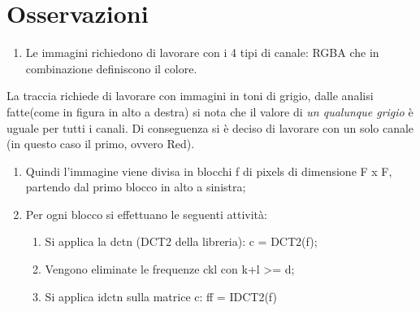 \documentclass[11pt,italian]{article}
\begin{document}
\section{Osservazioni}
\begin{enumerate}
    \item Le immagini richiedono di lavorare con i 4 tipi di canale: RGBA che in combinazione definiscono il colore.
\end{enumerate}
La traccia richiede di lavorare con immagini in toni di grigio, dalle analisi fatte(come in figura in alto a destra) si nota che il valore di \textit{un qualunque grigio} è uguale per tutti i canali.\newline
Di conseguenza si è deciso di lavorare con un solo canale (in questo caso il primo, ovvero Red).
\begin{enumerate}
    \item Quindi l’immagine viene divisa in blocchi f di pixels di dimensione F x F, partendo dal primo blocco in alto a sinistra;
    \item Per ogni blocco si effettuano le seguenti attività:
    \begin{enumerate}[label=\Alph*]
        \item Si applica la dctn (DCT2 della libreria): c = DCT2(f);
        \item Vengono eliminate le frequenze ckl con k+l >= d;
        \item Si applica idctn sulla matrice c: ff = IDCT2(f)
    \end{enumerate}
\end{enumerate}
\end{document}
